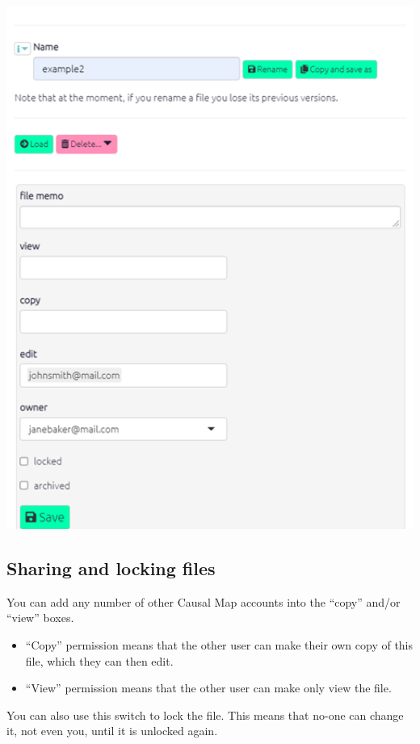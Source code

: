 \documentclass[
]{book}
\begin{document}
\includegraphics[width=6.77083in,height=\textheight]{_assets/image-20211025111538915.png}

\hypertarget{sharing-and-locking-files}{%
\subsection{Sharing and locking files}\label{sharing-and-locking-files}}

You can add any number of other Causal Map accounts into the ``copy'' and/or ``view'' boxes.

\begin{itemize}
\item
  ``Copy'' permission means that the other user can make their own copy of this file, which they can then edit.
\item
  ``View'' permission means that the other user can make only view the file.
\end{itemize}

You can also use this switch to lock the file. This means that no-one can change it, not even you, until it is unlocked again.
\end{document}
